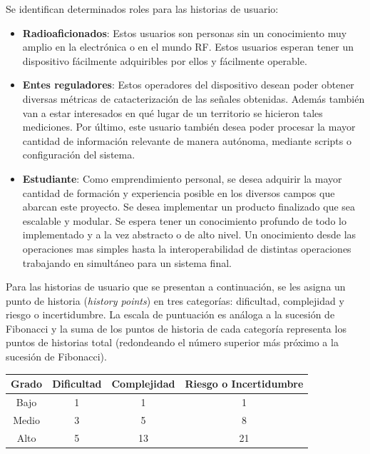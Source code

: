 \documentclass[
11pt, %
codirector, %
]{charter}
\begin{document}
Se identifican determinados roles para las historias de usuario:

\begin{itemize}
	\item \textbf{Radioaficionados}: Estos usuarios son personas sin un conocimiento muy amplio en la electrónica o en el mundo RF. Estos usuarios esperan tener un dispositivo fácilmente adquiribles por ellos y fácilmente operable.
	\item \textbf{Entes reguladores}: Estos operadores del dispositivo desean poder obtener diversas métricas de catacterización de las señales obtenidas. Además también van a estar interesados en qué lugar de un territorio se hicieron tales mediciones. Por último, este usuario también desea poder procesar la mayor cantidad de información relevante de manera autónoma, mediante scripts o configuración del sistema.
	\item \textbf{Estudiante}: Como emprendimiento personal, se desea adquirir la mayor cantidad de formación y experiencia posible en los diversos campos que abarcan este proyecto. Se desea implementar un producto finalizado que sea escalable y modular. Se espera tener un conocimiento profundo de todo lo implementado y a la vez abstracto o de alto nivel. Un onocimiento desde las operaciones mas simples hasta la interoperabilidad de distintas operaciones trabajando en simultáneo para un sistema final.
\end{itemize}

Para las historias de usuario que se presentan a continuación, se les asigna un punto de historia (\textit{history points}) en tres categorías: dificultad, complejidad y riesgo o incertidumbre. La escala de puntuación es análoga a la sucesión de Fibonacci y la suma de los puntos de historia de cada categoría representa los puntos de historias total (redondeando el número superior más próximo a la sucesión de Fibonacci).


\begin{table}[h]
\centering
\begin{tabular}{|c|c|c|c|} 
\hline
\rowcolor[HTML]{C0C0C0}
\hline 
\textbf{Grado} & \textbf{Dificultad} & \textbf{Complejidad} & \textbf{Riesgo o Incertidumbre}\\
\hline
Bajo & 1 & 1 & 1\\ 
\hline
Medio & 3 & 5 & 8\\ 
\hline
Alto & 5 & 13 & 21\\ 
\hline
\end{tabular}
\end{table}
\end{document}
